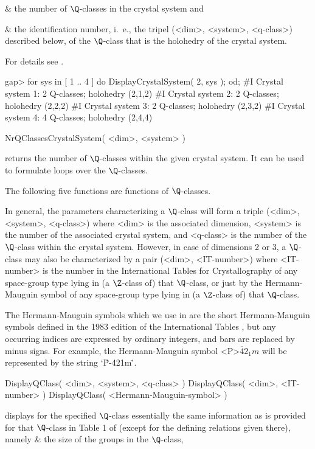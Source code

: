 \beginitems
& \itm the number of $\Q$-classes in the crystal system and

& \itm the identification number, i.~e., the tripel (<dim>, <system>,
       <q-class>) described below, of the $\Q$-class that is the 
       holohedry of the crystal system.  
\enditems

For details see \cite{BBNWZ78}.

\beginexample
gap> for sys in [ 1 .. 4 ] do  DisplayCrystalSystem( 2, sys );  od;
#I  Crystal system 1: 2 Q-classes; holohedry (2,1,2)
#I  Crystal system 2: 2 Q-classes; holohedry (2,2,2)
#I  Crystal system 3: 2 Q-classes; holohedry (2,3,2)
#I  Crystal system 4: 4 Q-classes; holohedry (2,4,4)
\endexample


\>NrQClassesCrystalSystem( <dim>, <system> )

returns the number of $\Q$-classes within the given crystal system.
It can be used to formulate loops over the $\Q$-classes.

The following five functions are functions of $\Q$-classes.

In general, the parameters characterizing a $\Q$-class will form a
triple (<dim>, <system>, <q-class>) where <dim> is the associated
dimension, <system> is the number of the associated crystal system,
and <q-class> is the number of the $\Q$-class within the crystal
system.  However, in case of dimensions 2 or 3, a $\Q$-class may also
be characterized by a pair (<dim>, <IT-number>) where <IT-number> is
the number in the International Tables for Crystallography
\cite{Hah83} of any space-group type lying in (a $\Z$-class of) that
$\Q$-class, or just by the Hermann-Mauguin symbol of any space-group
type lying in (a $\Z$-class of) that $\Q$-class.

The Hermann-Mauguin symbols  which we
use in {\GAP} are the short Hermann-Mauguin symbols defined in the
1983 edition of the International Tables \cite{Hah83}, but any
occurring indices are expressed by ordinary integers, and bars are
replaced by minus signs.  For example, the Hermann-Mauguin symbol
<P>$\overline{4}2_1m$ will be represented by the string `\"P-421m\"'.

\>DisplayQClass( <dim>, <system>, <q-class> )
\>DisplayQClass( <dim>, <IT-number> )
\>DisplayQClass( <Hermann-Mauguin-symbol> )

displays for the specified $\Q$-class essentially the same information
as is provided for that $\Q$-class in Table 1 of \cite{BBNWZ78}
(except for the defining relations given there), namely
\beginitems
& \itm the size of the groups in the $\Q$-class,

